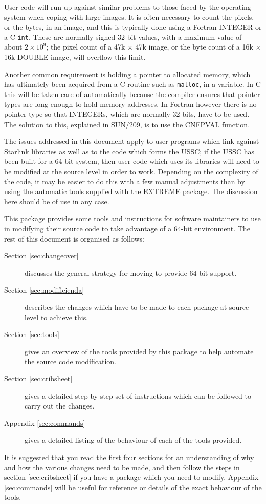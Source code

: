 \documentclass[twoside,11pt]{article}
\newcommand{\xref}[3]{#1}
\renewcommand{\_}{\texttt{\symbol{95}}}
\newcommand{\cc}[1]{{\tt #1}}
\begin{document}
User code will run up against similar problems to those faced by
the operating system when coping with large images.
It is often necessary to count the pixels, or the bytes,
in an image, and this is typically done using a Fortran INTEGER
or a C \cc{int}.  These are normally signed 32-bit values, with
a maximum value of about $2 \times 10^9$; the pixel count of a 
47k $\times$ 47k image, or the byte count of a 16k $\times$ 16k 
\_DOUBLE image, will overflow this limit.

Another common requirement is holding a pointer 
to allocated memory, which has ultimately been 
acquired from a C routine such as \cc{malloc}, 
in a variable.
In C this will be taken care of automatically because the compiler
ensures that pointer types are long enough to hold memory addresses.
In Fortran however there is no pointer type so that INTEGERs, which are
normally 32 bits, have to be used.
The solution to this, explained in \xref{SUN/209}{sun209}{pointers},
is to use the \xref{CNF\_PVAL}{sun209}{CNF\_PVAL} function.

The issues addressed in this document apply to user programs which link
against Starlink libraries as well as to the code which forms the USSC;
if the USSC has been built for a 64-bit system, then user code 
which uses its libraries will need to be modified at the 
source level in order to work.
Depending on the complexity of the code, it may be easier to do this
with a few manual adjustments than by using the automatic 
tools supplied with the EXTREME package.  
The discussion here should be of use in any case.

This package provides some tools and instructions for 
software maintainers to use 
in modifying their source code to take advantage of a 64-bit environment.
The rest of this document is organised as follows:
\begin{description}
%
\item[Section \ref{sec:changeover}]
discusses the general strategy for moving to provide 64-bit support.
%
\item[Section \ref{sec:modificienda}]
describes the changes which have to be made to each package at 
source level to achieve this.
%
\item[Section \ref{sec:tools}]
gives an overview of the tools provided by this package to help automate 
the source code modification.
%
\item[Section \ref{sec:cribsheet}]
gives a detailed step-by-step set of instructions which can be followed 
to carry out the changes.
%
\item[Appendix \ref{sec:commands}]
gives a detailed listing of the behaviour of each of the tools provided.
%
\end{description}
It is suggested that you read the first four sections
for an understanding of why and how the various changes need to be 
made, and then follow the steps in section \ref{sec:cribsheet}
if you have a package which you need to modify.
Appendix \ref{sec:commands} will be useful for reference or details
of the exact behaviour of the tools.
\end{document}
